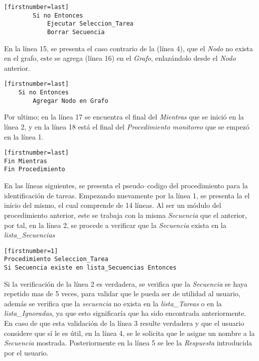 \begin{tiny}
\begin{lstlisting}[name=EXmonitor][firstnumber=last]
        Si no Entonces
            Ejecutar Seleccion_Tarea
            Borrar Secuencia
\end{lstlisting}
\end{tiny}


En la l\'inea 15, se presenta el caso contrario de la (l\'inea 4), que el 
 \emph{Nodo} no exista en el grafo, este se agrega (l\'inea 16) en el 
 \emph{Grafo}, enlaz\'andolo desde el \emph{Nodo} anterior. 


\begin{tiny}
\begin{lstlisting}[name=EXmonitor][firstnumber=last]
    Si no Entonces
        Agregar Nodo en Grafo
\end{lstlisting}
\end{tiny}


Por ultimo; en la l\'inea 17 se encuentra el final del \emph{Mientras} que se 
 inici\'o en la l\'inea 2, y en la l\'inea 18 est\'a el final del 
 \emph{Procedimiento monitoreo} que se empez\'o en la l\'inea 1.

\begin{tiny}
\begin{lstlisting}[name=EXmonitor][firstnumber=last]
Fin Mientras
Fin Procedimiento 
\end{lstlisting}
\end{tiny}




En las l\'ineas siguientes, se presenta el pseudo--codigo del procedimiento
 para la identificaci\'on de tareas. Empezando nuevamente por la l\'inea 1, se 
 presenta la el inicio del mismo, el cual comprende de 14 l\'ineas. Al ser un 
 m\'odulo del procedimiento anterior, este se trabaja con la misma 
 \emph{Secuencia} que el anterior, por tal, en la l\'inea 2, se procede a 
 verificar que la \emph{Secuencia} exista en la \emph{lista\_Secuencias} 

\begin{tiny}
\begin{lstlisting}[name=EXseleccion][firstnumber=1]
Procedimiento Seleccion_Tarea
Si Secuencia existe en lista_Secuencias Entonces
\end{lstlisting}
\end{tiny}

Si la verificaci\'on de la l\'inea 2 es verdadera, se verifica que la 
 \emph{Secuencia} se haya repetido mas de 5 veces, para validar que le pueda 
 ser de utilidad al usuario, adem\'as se verifica que la \emph{secuencia} no 
 exista en la \emph{lista\_Tareas} o en la \emph{lista\_Ignoradas}, ya que 
 esto significar\'ia que ha sido encontrada anteriormente. 
 En caso de que esta validaci\'on de la l\'inea 3 resulte verdadera
 y que el usuario considere que s\'i le es \'util, en la l\'inea 4, se le
 solicita que le asigne un nombre a la \emph{Secuencia} mostrada. 
 Posteriormente en la l\'inea 5 se lee la \emph{Respuesta} introducida por el 
 usuario.

